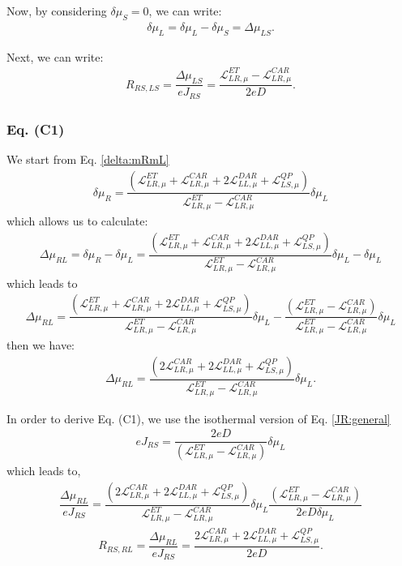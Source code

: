 Now, by considering $\delta\mu_{S}=0$, we can write:
\begin{align*}
\delta\mu_{L}=\delta\mu_{L}-\delta\mu_{S}=\Delta\mu_{LS}.
\end{align*}

Next, we can write:
\begin{align}\label{R:RS:LS:intermed}
R_{RS,LS}=\dfrac{\Delta\mu_{LS}}{eJ_{RS}}=\dfrac{\mathcal{L}_{LR,\mu}^{ET}-\mathcal{L}_{LR,\mu}^{CAR}}{2eD}.
\end{align}


\subsubsection{Eq. (C1)}

We start from Eq. \eqref{delta:mRmL}
\begin{align*}
\delta\mu_{R}=\dfrac{(\mathcal{L}_{LR,\mu}^{ET}+\mathcal{L}_{LR,\mu}^{CAR}+2\mathcal{L}_{LL,\mu}^{DAR}
+
\mathcal{L}^{QP}_{LS,\mu})}{\mathcal{L}_{LR,\mu}^{ET}-\mathcal{L}_{LR,\mu}^{CAR}}\delta\mu_{L}
\end{align*}
which allows us to calculate:
\begin{align*}
\Delta\mu_{RL}
=
\delta\mu_{R}-\delta\mu_{L}=
\dfrac{(\mathcal{L}_{LR,\mu}^{ET}+\mathcal{L}_{LR,\mu}^{CAR}+2\mathcal{L}_{LL,\mu}^{DAR}
+
\mathcal{L}^{QP}_{LS,\mu})}{\mathcal{L}_{LR,\mu}^{ET}-\mathcal{L}_{LR,\mu}^{CAR}}\delta\mu_{L}-\delta\mu_{L}
\end{align*}
which leads to 
\begin{align*}
\Delta\mu_{RL}
=
\dfrac{(\mathcal{L}_{LR,\mu}^{ET}+\mathcal{L}_{LR,\mu}^{CAR}+2\mathcal{L}_{LL,\mu}^{DAR}
+
\mathcal{L}^{QP}_{LS,\mu})}{\mathcal{L}_{LR,\mu}^{ET}-\mathcal{L}_{LR,\mu}^{CAR}}\delta\mu_{L}-\dfrac{(\mathcal{L}_{LR,\mu}^{ET}-\mathcal{L}_{LR,\mu}^{CAR})}{\mathcal{L}_{LR,\mu}^{ET}-\mathcal{L}_{LR,\mu}^{CAR}}\delta\mu_{L}
\end{align*}
then we have:
\begin{align}\label{Delta:mu:R:L}
\Delta\mu_{RL}
=
\dfrac{(2\mathcal{L}_{LR,\mu}^{CAR}+2\mathcal{L}_{LL,\mu}^{DAR}
+
\mathcal{L}^{QP}_{LS,\mu})}{\mathcal{L}_{LR,\mu}^{ET}-\mathcal{L}_{LR,\mu}^{CAR}}\delta\mu_{L}.
\end{align}


In order to derive Eq. (C1), we use the isothermal version of Eq. \eqref{JR:general}
\begin{align*}
eJ_{RS}=
\dfrac{2eD}{(\mathcal{L}_{LR,\mu}^{ET}-\mathcal{L}_{LR,\mu}^{CAR})}\delta\mu_{L}
\end{align*}
which leads to,
\begin{align*}
\dfrac{\Delta\mu_{RL}}{eJ_{RS}}
=
\dfrac{(2\mathcal{L}_{LR,\mu}^{CAR}+2\mathcal{L}_{LL,\mu}^{DAR}
+
\mathcal{L}^{QP}_{LS,\mu})}{\mathcal{L}_{LR,\mu}^{ET}-\mathcal{L}_{LR,\mu}^{CAR}}\delta\mu_{L}\dfrac{(\mathcal{L}_{LR,\mu}^{ET}-\mathcal{L}_{LR,\mu}^{CAR})}{2eD\delta\mu_{L}}
\end{align*}
\begin{align}\label{RRSRL}
R_{RS,RL}=
\dfrac{\Delta\mu_{RL}}{eJ_{RS}}
=
\dfrac{2\mathcal{L}_{LR,\mu}^{CAR}+2\mathcal{L}_{LL,\mu}^{DAR}
+
\mathcal{L}^{QP}_{LS,\mu}}{2eD}.
\end{align}


